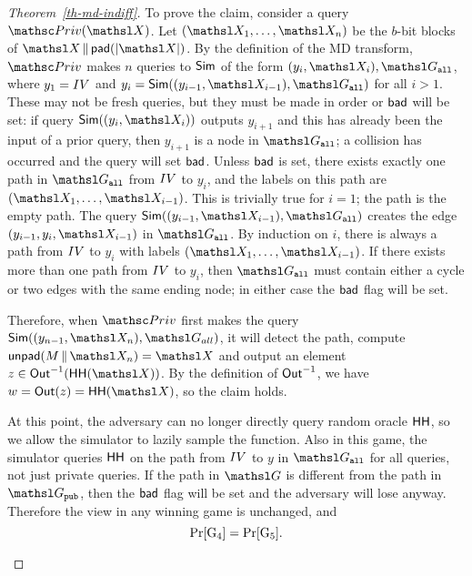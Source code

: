 \begin{proof}[Theorem~\ref{th-md-indiff}]
To prove the claim, consider a query $\PrivO(\XEDSA)$. Let $(\XEDSA_1, \ldots, \XEDSA_n)$ be the $b$-bit blocks of $\XEDSA \concat \padF(|\XEDSA|)$.
By the definition of the MD transform, $\PrivO$ makes $n$ queries to $\mathsf{Sim}$ of the form $(y_i, \XEDSA_i), \graph_{\all}$, where $y_1 = IV$ and $y_i = \simulator((y_{i-1}, \XEDSA_{i-1}), \graph_{\all})$ for all $i > 1$.
These may not be fresh queries, but they must be made in order or $\mathsf{bad}$ will be set:
if query $\simulator((y_i, \XEDSA_i))$ outputs $y_{i+1}$ and this has already been the input of a prior query, then $y_{i+1}$ is a node in $\graph_{\all}$; a collision has occurred and the query will set $\mathsf{bad}$.
Unless $\mathsf{bad}$ is set, there exists exactly one path in $\graph_{\all}$ from $IV$ to $y_i$, and the labels on this path are $(\XEDSA_1, \ldots, \XEDSA_{i-1})$.
This is trivially true for $i = 1$; the path is the empty path.
The query $\simulator((y_{i-1}, \XEDSA_{i-1}), \graph_{\all})$ creates the edge $(y_{i-1}, y_i, \XEDSA_{i-1})$ in $\graph_{\all}$.
By induction on $i$, there is always a path from $IV$ to $y_i$ with labels $(\XEDSA_1, \ldots, \XEDSA_{i-1})$.
If there exists more than one path from $IV$ to $y_i$, then $\graph_{\all}$ must contain either a cycle or two edges with the same ending node; in either case the $\mathsf{bad}$ flag will be set.

Therefore, when $\PrivO$ first makes the query $\simulator((y_{n-1}, \XEDSA_n), \graph_{all})$, it will detect the path, compute $\UnPadF(\msg \concat \XEDSA_n) = \XEDSA$ and output an element $z \in \Out^{-1}(\HH(\XEDSA))$. By the definition of $\mathsf{Out}^{-1}$, we have $w = \Out(z) = \HH(\XEDSA)$, so the claim holds.

At this point, the adversary can no longer directly query random oracle $\mathsf{HH}$, so
we allow the simulator to lazily sample the function.
Also in this game, the simulator queries $\mathsf{HH}$ on the path from $IV$ to $y$ in $\graph_{\all}$ for all queries, not just private queries.  
If the path in $\graph$ is different from the path in $\graph_{\public}$, then the $\mathsf{bad}$ flag
will be set and the adversary will lose anyway.
Therefore the view in any winning game is unchanged, and
\[ \Pr[\textnormal{G}_{4}] = \Pr[\textnormal{G}_5]. \]

\begin{figure}
	
\end{figure}
\end{proof}

